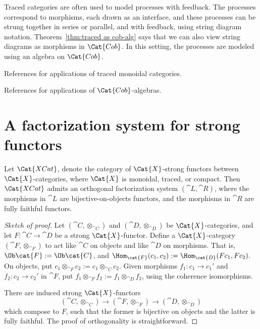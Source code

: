 Traced categories are often used to model processes with feedback. The processes correspond to morphisms, each drawn as an interface, and these processes can be strung together in series or parallel, and with feedback, using string diagram notation. Theorem~\ref{thm:traced as cob-alg} says that we can also view string diagrams as morphisms in $\Cat{Cob}$. In this setting, the processes are modeled using an algebra on $\Cat{Cob}$.

References for applications of traced monoidal categories.

References for applications of $\Cat{Cob}$-algebras.

\section{A factorization system for strong functors}

\begin{lemma}\label{lemma:factorization system}

Let $\Cat{XCat}$, denote the category of $\Cat{X}$-strong functors between $\Cat{X}$-categories,  where $\Cat{X}$ is monoidal, traced, or compact. Then $\Cat{XCat}$ admits an orthogonal factorization system $(\cat{L},\cat{R})$, where the morphisms in $\cat{L}$ are bijective-on-objects functors, and the morphisms in $\cat{R}$ are fully faithful functors.

\end{lemma}

\begin{proof}[Sketch of proof]

Let $(\cat{C},\otimes_{\cat{C}})$ and $(\cat{D},\otimes_{\cat{D}})$ be $\Cat{X}$-categories, and let $F\colon\cat{C}\to\cat{D}$ be a strong $\Cat{X}$-functor. Define a $\Cat{X}$-category $(\cat{F},\otimes_{\cat{F}})$ to act like $\cat{C}$ on objects and like $\cat{D}$ on morphisms. That is, $\Ob\cat{F}:=\Ob\cat{C}$, and $\Hom_{\cat{F}}(c_1,c_2):=\Hom_{\cat{D}}(Fc_1,Fc_2).$ On objects, put $c_1\otimes_{\cat{F}}c_2:=c_1\otimes_{\cat{C}}c_2$. Given morphisms $f_1\colon c_1\to c_1'$ and $f_2\colon c_2\to c_2'$ in $\cat{F}$, put $f_1\otimes_{\cat{F}}f_2:=f_1\otimes_{\cat{D}}f_2$, using the coherence isomorphisms.

There are induced strong $\Cat{X}$-functors 
$$(\cat{C},\otimes_{\cat{C}})\to(\cat{F},\otimes_{\cat{F}})\to(\cat{D},\otimes_{\cat{D}})$$
which compose to $F$, such that the former is bijective on objects and the latter is fully faithful. The proof of orthogonality is straightforward.

\end{proof}

